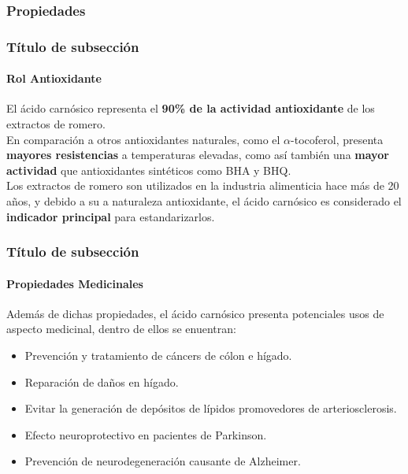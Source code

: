 \documentclass[aspectratio=1610]{beamer}
\newcommand{\ssec}{Título de subsección}
\begin{document}
\subsubsection{Propiedades}
\begin{frame}
	\frametitle{\ssec}
	\framesubtitle{Rol Antioxidante}
	El ácido carnósico representa el \textbf{90\% de la actividad antioxidante} de los extractos de romero.\\
	En comparación a otros antioxidantes naturales,
	como el $\alpha$-tocoferol, presenta \textbf{mayores resistencias} a temperaturas elevadas,
	como así también una \textbf{mayor actividad} que antioxidantes sintéticos como BHA y BHQ.\\

	Los extractos de romero son utilizados en la industria alimenticia hace más de 20 años,
	y debido a su a naturaleza antioxidante, el ácido carnósico es considerado el \textbf{indicador
	principal} para estandarizarlos.
\end{frame}

\begin{frame}
	\frametitle{\ssec}
	\framesubtitle{Propiedades Medicinales}
	Además de dichas propiedades, el ácido carnósico presenta potenciales usos de aspecto medicinal,
	dentro de ellos se enuentran:
	\begin{itemize}
	\item Prevención y tratamiento de cáncers de cólon e hígado.
	\item Reparación de daños en hígado.
	\item Evitar la generación de depósitos de lípidos promovedores de arteriosclerosis.
	\item Efecto neuroprotectivo en pacientes de Parkinson.
	\item Prevención de neurodegeneración causante de Alzheimer.
	\end{itemize}
\end{frame}
\end{document}

